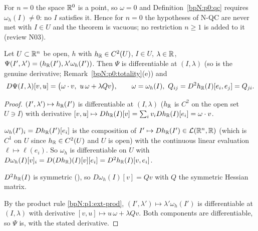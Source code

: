 \begin{remark}[$n=0$]\label{bpN:p2:n0}
For $n=0$ the space $\mathbb{R}^0$ is a point, so $\omega=0$ and Definition~\ref{bpN:p0:qc} requires $\omega_h(I)\ne0$: no $I$ satisfies it. Hence for $n=0$ the hypotheses of N-QC are never met with $I\in U$ and the theorem is vacuous; no restriction $n\ge1$ is added to it (review N03).
\end{remark}

\begin{lemma}\label{bpN:p2:qc-deriv}
Let $U\subset\mathbb{R}^n$ be open, $h$ with $h_{\mathbb{R}}\in C^2(U)$, $I\in U$, $\lambda\in\mathbb{R}$, $\Psi(I',\lambda')=(h_{\mathbb{R}}(I'),\lambda'\omega_h(I'))$. Then $\Psi$ is differentiable at $(I,\lambda)$ (so  is the genuine derivative; Remark~\ref{bpN:p0:totality}(e)) and
\[D\Psi(I,\lambda)[v,u]=\bigl(\omega\cdot v,\ u\,\omega+\lambda Qv\bigr),\qquad\omega=\omega_h(I),\ Q_{ij}=D^2h_\R(I)[e_i,e_j]=Q_{ji}.\]
\end{lemma}
\begin{proof}
\label{stepN:p2:qd-first} $(I',\lambda')\mapsto h_{\mathbb{R}}(I')$ is differentiable at $(I,\lambda)$ ($h_{\mathbb{R}}$ is $C^2$ on the open set $U\ni I$) with derivative $[v,u]\mapsto Dh_{\mathbb{R}}(I)[v]=\sum_iv_iDh_{\mathbb{R}}(I)[e_i]=\omega\cdot v$.

\label{stepN:p2:qd-freq} $\omega_h(I')_i=Dh_{\mathbb{R}}(I')[e_i]$ is the composition of $I'\mapsto Dh_{\mathbb{R}}(I')\in\mathcal L(\mathbb{R}^n,\mathbb{R})$ (which is $C^1$ on $U$ since $h_{\mathbb{R}}\in C^2(U)$ and $U$ is open) with the continuous linear evaluation $\ell\mapsto\ell(e_i)$. So $\omega_h$ is differentiable on $U$ with $D\omega_h(I)[v]_i=D(Dh_{\mathbb{R}})(I)[v][e_i]=D^2h_{\mathbb{R}}(I)[v,e_i]$.

\label{stepN:p2:qd-sym} $D^2h_{\mathbb{R}}(I)$ is symmetric (), so $D\omega_h(I)[v]=Qv$ with $Q$ the symmetric Hessian matrix.

\label{stepN:p2:qd-prod} By the product rule \ref{bpN:p1:ext-prod}, $(I',\lambda')\mapsto\lambda'\omega_h(I')$ is differentiable at $(I,\lambda)$ with derivative $[v,u]\mapsto u\,\omega+\lambda Qv$. Both components are differentiable, so $\Psi$ is, with the stated derivative.
\end{proof}

